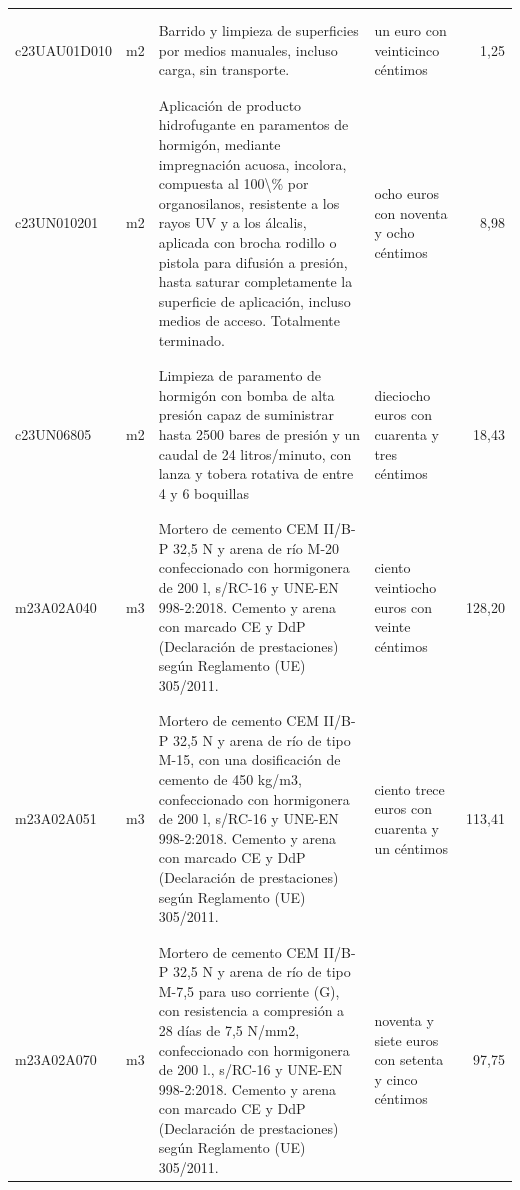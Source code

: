 \documentclass{book}%
\begin{document}
\begin{longtable}{|l|l|p{5cm}|p{3cm}|r|}
&&&&\\%
&&&&\\%
c23UAU01D010&m2&Barrido y limpieza de superficies por medios manuales, incluso carga, sin transporte.&un euro con veinticinco céntimos&1,25\\%
&&&&\\%
&&&&\\%
c23UN010201&m2&Aplicación de producto hidrofugante en paramentos de hormigón, mediante impregnación acuosa, incolora, compuesta al 100\textbackslash{}\% por organosilanos, resistente a los rayos UV y a los álcalis, aplicada con brocha rodillo o pistola para difusión a presión, hasta saturar completamente la superficie de aplicación, incluso medios de acceso. Totalmente terminado.&ocho euros con noventa y ocho céntimos&8,98\\%
&&&&\\%
&&&&\\%
c23UN06805&m2&Limpieza de paramento de hormigón con bomba de alta presión capaz de suministrar hasta 2500 bares de presión y un caudal de 24 litros/minuto, con lanza y tobera rotativa de entre 4 y 6 boquillas&dieciocho euros con cuarenta y tres céntimos&18,43\\%
&&&&\\%
&&&&\\%
m23A02A040&m3&Mortero de cemento CEM II/B{-}P 32,5 N y arena de río M{-}20 confeccionado con hormigonera de 200 l, s/RC{-}16 y UNE{-}EN 998{-}2:2018. Cemento y arena con marcado CE y DdP (Declaración de prestaciones) según Reglamento (UE) 305/2011.&ciento veintiocho euros con veinte céntimos&128,20\\%
&&&&\\%
&&&&\\%
m23A02A051&m3&Mortero de cemento CEM II/B{-}P 32,5 N y arena de río de tipo M{-}15, con una dosificación de cemento de 450 kg/m3, confeccionado con hormigonera de 200 l, s/RC{-}16 y UNE{-}EN 998{-}2:2018. Cemento y arena con marcado CE y DdP (Declaración de prestaciones) según Reglamento (UE) 305/2011.&ciento trece euros con cuarenta y un céntimos&113,41\\%
&&&&\\%
&&&&\\%
m23A02A070&m3&Mortero de cemento CEM II/B{-}P 32,5 N y arena de río de tipo M{-}7,5 para uso corriente (G), con resistencia a compresión a 28 días de 7,5 N/mm2, confeccionado con hormigonera de 200 l., s/RC{-}16 y UNE{-}EN 998{-}2:2018. Cemento y arena con marcado CE y DdP (Declaración de prestaciones) según Reglamento (UE) 305/2011.&noventa y siete euros con setenta y cinco céntimos&97,75\\%

\end{longtable}
\end{document}
